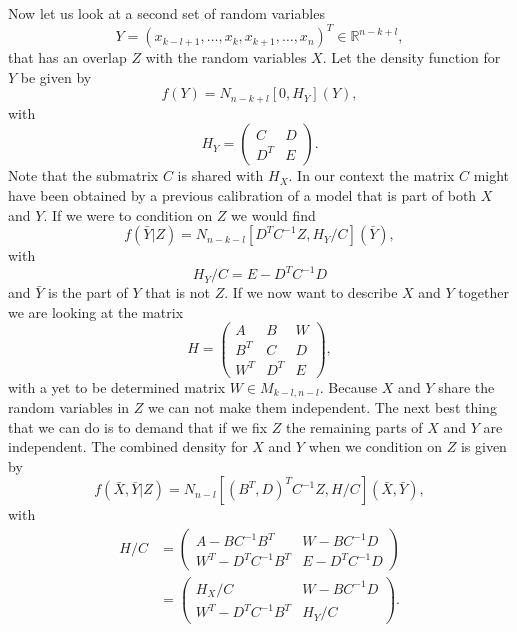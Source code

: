 \documentclass[11pt, a4paper]{article}
\newcommand{\R}{\mathbb{R}}
\begin{document}
Now let us look at a second set of random variables 
\begin{equation}
	Y = (x_{k-l+1}, \ldots, x_k, x_{k+1}, \ldots, x_n)^T \in \R^{n-k+l},
\end{equation}
that has an overlap $Z$ with the random variables $X$. Let the density function for $Y$ be given by
\begin{equation}
	f(Y) = N_{n-k+l}[0,H_Y] ( Y),
\end{equation}
with
\begin{equation}
	H_Y = \begin{pmatrix}
		C & D \\
		D^T & E
	\end{pmatrix}.
\end{equation}
Note that the submatrix $C$ is shared with $H_X$. In our context the matrix $C$ might have been obtained by a previous calibration of a model that is part of both $X$ and $Y$. If we were to condition on $Z$ we would find
\begin{equation}
	f(\bar Y\vert Z) = N_{n-k-l}[ D^T C^{-1}Z,H_Y/C](\bar Y), 
\end{equation}
with
\begin{equation}\label{eqn.hyc}
	H_Y/C = E - D^TC^{-1}D
\end{equation}
and $\bar Y$ is the part of $Y$ that is not $Z$. If we now want to describe $X$ and $Y$ together we are looking at the matrix
\begin{equation}
	H = \begin{pmatrix}
		A & B & W \\
		B^T & C & D \\
		W^T & D^T & E
	\end{pmatrix},
\end{equation}
with a yet to be determined matrix $W\in M_{k-l,n-l}$. Because $X$ and $Y$ share the random variables in $Z$ we can not make them independent. The next best thing that we can do is to demand that if we fix $Z$ the remaining parts of $X$ and $Y$ are independent. The combined density for $X$ and $Y$ when we condition on $Z$ is given by
\begin{equation}
	f( \bar X,\bar Y\vert Z) = N_{n-l}[ (B^T,D)^TC^{-1}Z, H/C](\bar X, \bar Y),
\end{equation}
with
\begin{align}
	H/C & = \begin{pmatrix}
		A - B C^{-1}B^T & W - B C^{-1} D \\
		W^T - D^TC^{-1}B^T & E - D^TC^{-1}D
	\end{pmatrix}\\
  & = \begin{pmatrix}
		H_X/C & W - B C^{-1} D \\
		W^T - D^TC^{-1}B^T & H_Y/C
	\end{pmatrix}.
\end{align}
\end{document}
